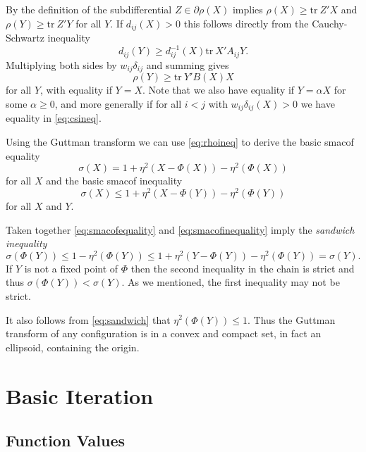 \documentclass[
  12pt,
]{article}
\begin{document}
By the definition of the subdifferential \(Z\in\partial\rho(X)\) implies \(\rho(X)\geq\text{tr}\ Z'X\) and \(\rho(Y)\geq\text{tr}\ Z'Y\) for all \(Y\). If
\(d_{ij}(X)>0\) this follows directly from the Cauchy-Schwartz inequality
\begin{equation}
d_{ij}(Y)\geq d_{ij}^{-1}(X)\text{tr}\ X'A_{ij}Y.
\label{eq:csineq}
\end{equation}
Multiplying both sides by \(w_{ij}\delta_{ij}\) and summing gives
\begin{equation}
\rho(Y)\geq\text{tr}\ Y'B(X)X
\label{eq:rhoineq}
\end{equation}
for all \(Y\), with equality if \(Y=X\). Note that we also have equality if \(Y=\alpha X\) for some \(\alpha\geq 0\), and more generally if for all \(i<j\) with \(w_{ij}\delta_{ij}(X)>0\) we have equality in \eqref{eq:csineq}.

Using the Guttman transform we can use \eqref{eq:rhoineq} to derive the basic smacof equality
\begin{equation}
\sigma(X)=1+\eta^2(X-\Phi(X))-\eta^2(\Phi(X))
\label{eq:smacofequality}
\end{equation}
for all \(X\) and the basic smacof inequality
\begin{equation}
\sigma(X)\leq 1+\eta^2(X-\Phi(Y))-\eta^2(\Phi(Y))
\label{eq:smacofinequality}
\end{equation}
for all \(X\) and \(Y\).

Taken together \eqref{eq:smacofequality} and \eqref{eq:smacofinequality} imply the \emph{sandwich inequality}
\begin{equation}
\sigma(\Phi(Y))\leq 1-\eta^2(\Phi(Y))\leq 1+\eta^2(Y-\Phi(Y))-\eta^2(\Phi(Y))=\sigma(Y).
\label{eq:sandwich}
\end{equation}
If \(Y\) is not a fixed point of \(\Phi\) then the second inequality in the
chain is strict and thus \(\sigma(\Phi(Y))<\sigma(Y)\). As we mentioned, the
first inequality may not be strict.

It also follows
from \eqref{eq:sandwich} that \(\eta^2(\Phi(Y))\leq 1\). Thus the Guttman
transform of any configuration is in a convex and compact set, in fact an ellipsoid,
containing the origin.

\section{Basic Iteration}\label{basic-iteration}

\subsection{Function Values}\label{function-values}
\end{document}
